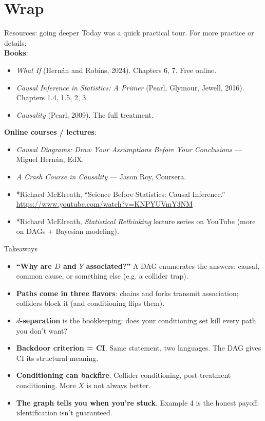 \documentclass[xcolor=dvipsnames]{beamer}
\begin{document}
\section{Wrap}

\begin{frame}{Resources: going deeper}
\small
{} Today was a quick practical tour.  For more practice or details:\\[4pt]

 \textbf{Books}:
\begin{itemize}
\footnotesize
\item \textit{What If} (Hern\'an and Robins, 2024).  Chapters 6, 7.  Free online.
\item \textit{Causal Inference in Statistics: A Primer} (Pearl, Glymour, Jewell, 2016).  Chapters 1.4, 1.5, 2, 3.
\item \textit{Causality} (Pearl, 2009).  The full treatment.
\end{itemize}

\bigskip
{} \textbf{Online courses / lectures}:
\begin{itemize}
\footnotesize
\item \textit{Causal Diagrams: Draw Your Assumptions Before Your Conclusions} --- Miguel Hern\'an, EdX.
\item \textit{A Crash Course in Causality} --- Jason Roy, Coursera.
\item *Richard McElreath, ``Science Before Statistics: Causal Inference.''\\
\url{https://www.youtube.com/watch?v=KNPYUVmY3NM}
\item *Richard McElreath, \textit{Statistical Rethinking} lecture series on YouTube (more on DAGs + Bayesian modeling).
\end{itemize}
\end{frame}


\begin{frame}{Takeaways}
\small
\begin{itemize}
\item<1-> \textbf{``Why are $D$ and $Y$ associated?''}  A DAG enumerates the answers: causal, common cause, or something else (e.g. a collider trap).
\medskip
\item<2-> \textbf{Paths come in three flavors}: chains and forks transmit association; colliders block it (and conditioning flips them).
\medskip
\item<3-> \textbf{$d$-separation} is the bookkeeping: does your conditioning set kill every path you don't want?
\medskip
\item<4-> \textbf{Backdoor criterion = CI}.  Same statement, two languages.  The DAG gives CI its structural meaning.
\medskip
\item<5-> \textbf{Conditioning can backfire}.  Collider conditioning, post-treatment conditioning.  More $X$ is not always better.
\medskip
\item<6-> \textbf{The graph tells you when you're stuck}.  Example 4 is the honest payoff: identification isn't guaranteed.
\end{itemize}
\end{frame}
\end{document}
